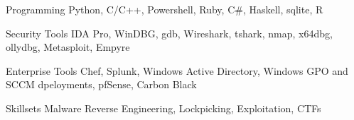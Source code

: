 


\begin{cvskills}


\cvskill
{Programming} %
{Python, C/C++, Powershell, Ruby, C\#, Haskell, sqlite, R} %


\cvskill
{Security Tools} %
{IDA Pro, WinDBG, gdb, Wireshark, tshark, nmap, x64dbg, ollydbg, Metasploit, Empyre} %


\cvskill
{Enterprise Tools} %
{Chef, Splunk, Windows Active Directory, Windows GPO and SCCM dpeloyments, pfSense, Carbon Black} %


\cvskill
{Skillsets} %
{Malware Reverse Engineering, Lockpicking, Exploitation, CTFs} %


\end{cvskills}